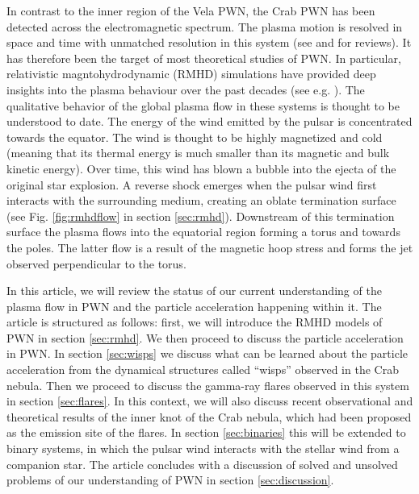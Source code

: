In contrast to the inner region of the Vela PWN, the Crab PWN has been detected across the electromagnetic spectrum. The plasma motion is resolved in space and time with unmatched resolution in this system (see \citep{Hester_2008} and \citep{BuehlerBlandford2013a} for reviews). It has therefore been the target of most theoretical studies of PWN. In particular, relativistic magntohydrodynamic (RMHD) simulations have provided deep insights into the plasma behaviour over the past decades (see e.g.  \citep{Komissarov_2004,Del_Zanna_2006,Porth_2013}). The qualitative behavior of the global plasma flow in these systems is thought to be understood to date. The energy of the wind emitted by the pulsar is concentrated towards the equator. The wind is thought to be highly magnetized and cold (meaning that its thermal energy is much smaller than its magnetic and bulk kinetic energy). Over time, this wind has blown a bubble into the ejecta of the original star explosion. A reverse shock emerges when the pulsar wind first interacts with the surrounding medium, creating an oblate termination surface (see {\cred Fig. \ref{fig:rmhdflow}} in section \ref{sec:rmhd}). Downstream of this termination surface the plasma flows into the equatorial region forming a torus and towards the poles. The latter flow is a result of the magnetic hoop stress and forms the jet observed perpendicular to the torus.

In this article, we will review the status of our current understanding of the plasma flow in PWN and the particle acceleration happening within it. The article is structured as follows: first, we will introduce the RMHD models of PWN in section \ref{sec:rmhd}. We then proceed to discuss the particle acceleration in PWN. In section \ref{sec:wisps} we discuss what can be learned about the particle acceleration from the dynamical structures called ``wisps'' observed in the Crab nebula. Then we proceed to discuss the gamma-ray flares observed in this system in section \ref{sec:flares}. In this context, we will also discuss recent observational and theoretical results of the inner knot of the Crab nebula, which had been proposed as the emission site of the flares. In section \ref{sec:binaries} this will be extended to binary systems, in which the pulsar wind interacts with the stellar wind from a companion star. The article concludes with a discussion of solved and unsolved problems of our understanding of PWN in section \ref{sec:discussion}.